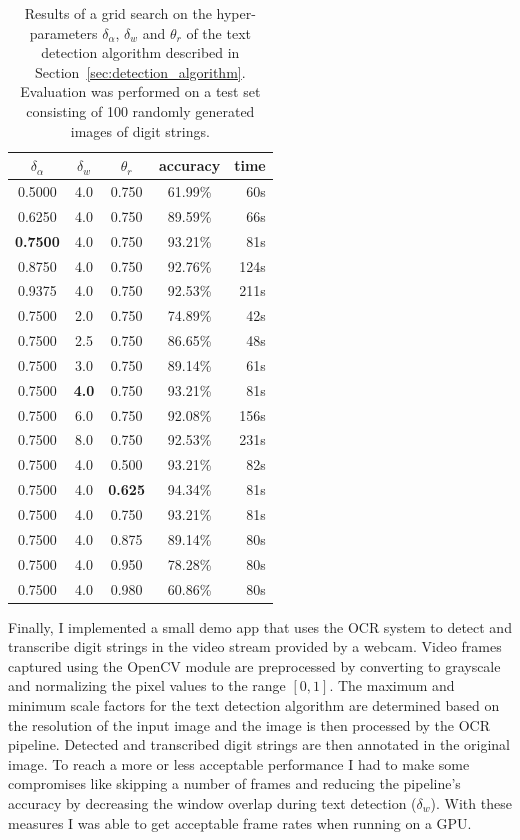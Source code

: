 \documentclass[12pt]{article}
\newcommand\secref[1]{Section~\ref{sec:#1}}
\begin{document}
\begin{table}[b!]
\centering
\caption{Results of a grid search on the hyper-parameters $\delta_\alpha$, $\delta_w$ and $\theta_r$
of the text detection algorithm described in \secref{detection_algorithm}.
Evaluation was performed on a test set consisting of 100 randomly generated images of digit strings.}
\label{tab:gridsearch}
\footnotesize
\begin{tabular}{|c|c|c|c|r|}
\hline
\rowcolor{lightgray}$\delta_\alpha$ & $\delta_w$ & $\theta_r$ & accuracy & time \\
\hline
0.5000  &  4.0  &  0.750  &  61.99\%  &  60s \\
0.6250  &  4.0  &  0.750  &  89.59\%  &  66s \\
\rowcolor{Honeydew2} {\bf 0.7500}  &  4.0  &  0.750  &  93.21\%  &  81s \\
0.8750  &  4.0  &  0.750  &  92.76\%  & 124s \\
0.9375  &  4.0  &  0.750  &  92.53\%  & 211s \\
\hline
0.7500  &  2.0  &  0.750  &  74.89\%  &  42s \\
0.7500  &  2.5  &  0.750  &  86.65\%  &  48s \\
0.7500  &  3.0  &  0.750  &  89.14\%  &  61s \\
\rowcolor{Honeydew2} 0.7500  &  {\bf 4.0}  &  0.750  &  93.21\%  &  81s \\
0.7500  &  6.0  &  0.750  &  92.08\%  & 156s \\
0.7500  &  8.0  &  0.750  &  92.53\%  & 231s \\
\hline
0.7500  &  4.0  &  0.500  &  93.21\%  &  82s \\
\rowcolor{Honeydew2} 0.7500  &  4.0  &  {\bf 0.625}  &  94.34\%  &  81s \\
0.7500  &  4.0  &  0.750  &  93.21\%  &  81s \\
0.7500  &  4.0  &  0.875  &  89.14\%  &  80s \\
0.7500  &  4.0  &  0.950  &  78.28\%  &  80s \\
0.7500  &  4.0  &  0.980  &  60.86\%  &  80s \\
\hline
\end{tabular}
\end{table}

Finally, I implemented a small demo app that uses the OCR system to detect and transcribe
digit strings in the video stream provided by a webcam. Video frames captured using
the OpenCV \cite{OpenCVOp84:online} module are preprocessed by converting to grayscale and
normalizing the pixel values to the range $[0,1]$. The maximum and minimum scale
factors for the text detection algorithm are determined based on the resolution of the
input image and the image is then processed by the OCR pipeline. Detected and transcribed
digit strings are then annotated in the original image. To reach a more or less acceptable
performance I had to make some compromises like skipping a number of frames and reducing
the pipeline's accuracy by decreasing the window overlap during text detection ($\delta_w$).
With these measures I was able to get acceptable frame rates when running on a GPU.
\end{document}
